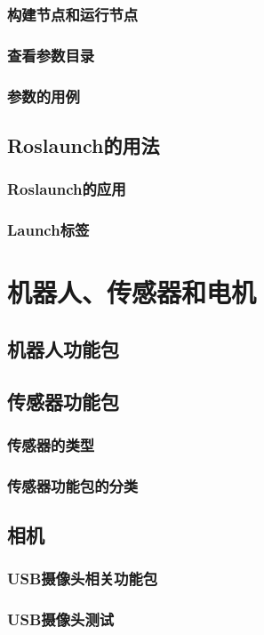 \documentclass[geye,green,kindle,cn]{elegantnote}
\begin{document}
\subsubsection{构建节点和运行节点}
\subsubsection{查看参数目录}
\subsubsection{参数的用例}
\subsection{Roslaunch的用法}
\subsubsection{Roslaunch的应用}
\subsubsection{Launch标签}
\section{机器人、传感器和电机}
\subsection{机器人功能包}
\subsection{传感器功能包}
\subsubsection{传感器的类型}
\subsubsection{传感器功能包的分类}
\subsection{相机}
\subsubsection{USB摄像头相关功能包}
\subsubsection{USB摄像头测试}
\end{document}
